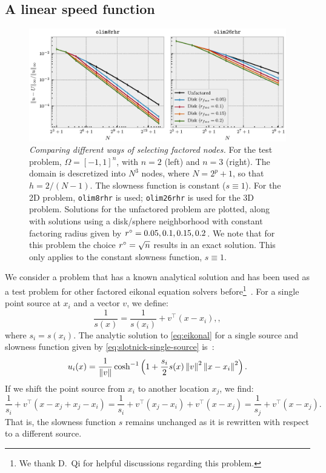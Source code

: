 \documentclass{article}
\begin{document}
\subsection{A linear speed function}\label{ssec:slotnick}

\begin{figure}
  \centering
  \includegraphics[width=\linewidth]{factoring-error-example.eps}%
  \caption{\emph{Comparing different ways of selecting factored
      nodes.} For the test problem, $\Omega = [-1, 1]^n$, with $n = 2$
    (left) and $n = 3$ (right). The domain is descretized into $N^3$
    nodes, where $N = 2^p + 1$, so that $h = 2/(N - 1)$. The slowness
    function is constant ($s \equiv 1$). For the 2D problem,
    \texttt{olim8rhr} is used; \texttt{olim26rhr} is used for the 3D
    problem. Solutions for the unfactored problem are plotted, along
    with solutions using a disk/sphere neighborhood with constant
    factoring radius given by $r^\circ = 0.05, 0.1, 0.15, 0.2$. We note
    that for this problem the choice $r^\circ = \sqrt{n}$ results in an
    exact solution. This only applies to the constant slowness
    function, $s \equiv 1$.  }\label{fig:factoring-error-example}
\end{figure}

We consider a problem that has a known analytical solution and has
been used as a test problem for other factored eikonal equation
solvers before\footnote{We thank D.\ Qi for helpful discussions
  regarding this
  problem.}~\cite{slotnick1959lessons,fomel2009fast,qi2018corner}. For
a single point source at $x_i$ and a vector $v$, we define:
\begin{equation}
  \label{eq:slotnick-single-source}
  \frac{1}{s(x)} = \frac{1}{s(x_i)} + v^\top {(x - x_i)},,
\end{equation}
where $s_i = s(x_i)$. The analytic solution to \cref{eq:eikonal} for a
single source and slowness function given by
\cref{eq:slotnick-single-source} is~\cite{slotnick1959lessons}:
\begin{equation}
  \label{eq:slotnick-single-source-solution}
  u_i(x) = \frac{1}{\left\|v\right\|} \cosh^{-1} \left(1 + \frac{s_i}{2} s(x) \left\|v\right\|^2 \left\|x - x_i\right\|^2\right).
\end{equation}
If we shift the point source from $x_i$ to another location $x_j$, we
find:
\begin{equation}
  \label{eq:slotnick-slowness-shift}
  \frac{1}{s_i} + v^\top {(x - x_j + x_j - x_i)} = \frac{1}{s_i} + v^\top {(x_j - x_i)} + v^\top {(x - x_j)} = \frac{1}{s_j} + v^\top {(x - x_j)}.
\end{equation}
That is, the slowness function $s$ remains unchanged as it is
rewritten with respect to a different source.
\end{document}
